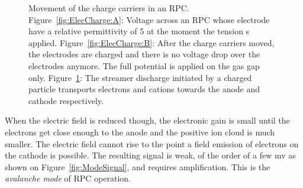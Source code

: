 \begin{figure}[H]
\begin{subfigure}{\linewidth}
			\caption{\label{fig:ElecCharge:C}}
		\end{subfigure}
		\caption{\label{fig:ElecCharge} Movement of the charge carriers in an RPC. Figure~\ref{fig:ElecCharge:A}: Voltage across an RPC whose electrode have a relative permittivity of 5 at the moment the tension s applied. Figure~\ref{fig:ElecCharge:B}: After the charge carriers moved, the electrodes are charged and there is no voltage drop over the electrodes anymore. The full potential is applied on the gas gap only. Figure~\ref{fig:ElecCharge:C}: The streamer discharge initiated by a charged particle transports electrons and cations towards the anode and cathode respectively.}
	\end{figure}
	
	When the electric field is reduced though, the electronic gain is small until the electrons get close enough to the anode and the positive ion cloud is much smaller. The electric field cannot rise to the point a field emission of electrons on the cathode is possible. The resulting signal is weak, of the order of a few \si{mv} as shown on Figure~\ref{fig:ModeSignal}, and requires amplification. This is the \textit{avalanche mode} of RPC operation.
	
